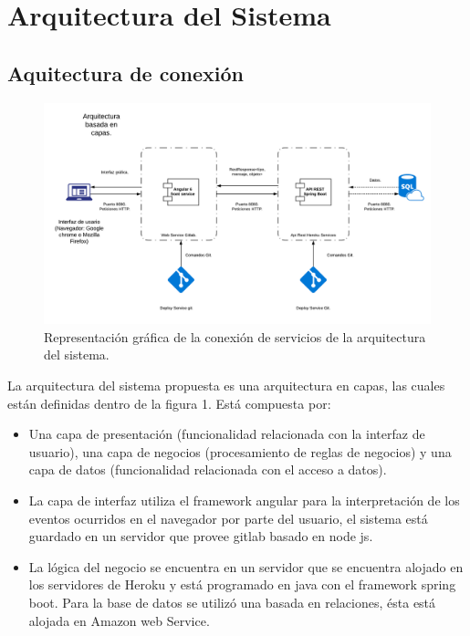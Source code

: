 \section{Arquitectura del Sistema}

\subsection{Aquitectura de conexión}


\begin{figure}[!h]
	\centering
	\includegraphics[width=0.8\linewidth]{images/Arquitectura/Blank_Diagram2.png}
	\caption{Representación gráfica de la conexión de servicios de la arquitectura del sistema.}
\end{figure}


La arquitectura del sistema propuesta es una arquitectura en capas, las cuales están definidas dentro de la figura 1. Está compuesta por:

\begin{itemize}
	\item Una capa de presentación (funcionalidad relacionada con la interfaz de usuario), una capa de negocios (procesamiento de reglas de negocios) y una capa de datos (funcionalidad relacionada con el acceso a datos).

	\item La capa de interfaz utiliza el framework angular para la interpretación  de los eventos ocurridos en el navegador por parte del usuario, el sistema está guardado en un servidor que provee gitlab basado en node js.

	\item La lógica del negocio se encuentra en un servidor que se encuentra alojado en los servidores de Heroku y está programado en java con el framework spring boot. Para la base de datos se utilizó una basada en relaciones, ésta está alojada en Amazon web Service.
\end{itemize}


